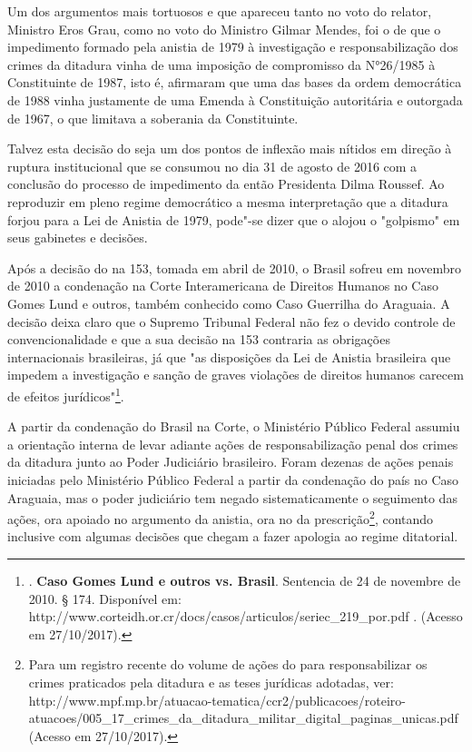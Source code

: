 Um dos argumentos mais tortuosos e que apareceu tanto no voto do
relator, Ministro Eros Grau, como no voto do Ministro Gilmar Mendes, foi
o de que o impedimento formado pela anistia de 1979 à investigação e
responsabilização dos crimes da ditadura vinha de uma imposição de
compromisso da  N°26/1985 à Constituinte de 1987, isto é, afirmaram
que uma das bases da ordem democrática de 1988 vinha justamente de uma
Emenda à Constituição autoritária e outorgada de 1967, o que limitava a
soberania da Constituinte.

Talvez esta decisão do  seja um dos pontos de inflexão mais nítidos
em direção à ruptura institucional que se consumou no dia 31 de agosto
de 2016 com a conclusão do processo de impedimento da então Presidenta
Dilma Roussef. Ao reproduzir em pleno regime democrático a mesma
interpretação que a ditadura forjou para a Lei de Anistia de 1979,
pode"-se dizer que o  alojou o "golpismo" em seus gabinetes e
decisões.

Após a decisão do  na  153, tomada em abril de 2010, o Brasil
sofreu em novembro de 2010 a condenação na Corte Interamericana de
Direitos Humanos no Caso Gomes Lund e outros, também conhecido como Caso
Guerrilha do Araguaia. A decisão deixa claro que o Supremo Tribunal
Federal não fez o devido controle de convencionalidade e que a sua
decisão na  153 contraria as obrigações internacionais brasileiras,
já que "as disposições da Lei de Anistia brasileira que impedem a
investigação e sanção de graves violações de direitos humanos carecem de
efeitos jurídicos"\footnote{.
  \textbf{Caso Gomes Lund e outros vs. Brasil}. Sentencia de 24 de
  novembre de 2010. § 174. Disponível em:
  http://www.corteidh.or.cr/docs/casos/articulos/seriec\_219\_por.pdf .
  (Acesso em 27/10/2017).}.

A partir da condenação do Brasil na Corte, o Ministério Público Federal
assumiu a orientação interna de levar adiante ações de responsabilização
penal dos crimes da ditadura junto ao Poder Judiciário brasileiro. Foram
dezenas de ações penais iniciadas pelo Ministério Público Federal a
partir da condenação do país no Caso Araguaia, mas o poder judiciário
tem negado sistematicamente o seguimento das ações, ora apoiado no
argumento da anistia, ora no da prescrição\footnote{Para um registro
  recente do volume de ações do  para responsabilizar os crimes
  praticados pela ditadura e as teses jurídicas adotadas, ver:
  http://www.mpf.mp.br/atuacao-tematica/ccr2/publicacoes/roteiro-atuacoes/005\_17\_crimes\_da\_ditadura\_militar\_digital\_paginas\_unicas.pdf
  (Acesso em 27/10/2017).}, contando inclusive com algumas decisões que
chegam a fazer apologia ao regime ditatorial.

